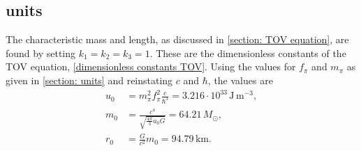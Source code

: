 \subsection{units}

The characteristic mass and length, as discussed in \autoref{section: TOV equation}, are found by setting $k_1 = k_2 = k_3 = 1$.
These are the dimensionless constants of the TOV equation, \autoref{dimensionless constants TOV}.
Using the values for $f_\pi$ and $m_\pi$ as given in \autoref{section: units} and reinstating $c$ and $\hbar$, the values are
%
\begin{align}
    u_0 & =m_\pi^2 f_\pi^2 \frac{c}{\hbar^3}
    = 3.216\cdot 10^{33} \, \text{J}\,\text{m}^{-3}, \\
    m_0 & = \frac{c^4}{\sqrt{\frac{4 \pi}{ 3} u_0 G}} = 64.21\, M_\odot, \\
    r_0 & = \frac{G}{c^2} m_0 = 94.79 \, \text{km}.
\end{align}
%

